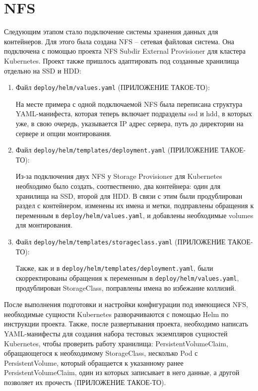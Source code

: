 \section{NFS}
\label{sec:nfs}

Следующим этапом стало подключение системы хранения данных для контейнеров. Для этого была создана NFS
-- сетевая файловая система. Она подключена с помощью проекта NFS Subdir External Provisioner для кластера Kubernetes. Проект также пришлось адаптировать под созданные хранилища отдельно на SSD
и HDD:
\begin{enumerate}
    \item Файл \texttt{deploy/helm/values.yaml} (ПРИЛОЖЕНИЕ ТАКОЕ-ТО):

        На месте примера с одной подключаемой NFS была переписана структура YAML-манифеста, которая теперь включает подразделы ssd и hdd, в которых уже, в свою очередь, указывается IP адрес сервера, путь до директории на сервере и опции монтирования.

    \item Файл \texttt{deploy/helm/templates/deployment.yaml} (ПРИЛОЖЕНИЕ ТАКОЕ-ТО):

        Из-за подключения двух NFS у Storage Provisioner
        для Kubernetes необходимо было создать, соотвественно, два контейнера: один для хранилища на SSD, второй для HDD. В связи с этим были продублирован раздел с контейнером, изменены их имена и метки, подправлены обращения к переменным в \texttt{deploy/helm/values.yaml}, и добавлены необходимые volumes
        для монтирования.

    \item Файл \texttt{deploy/helm/templates/storageclass.yaml} (ПРИЛОЖЕНИЕ ТАКОЕ-ТО):

        Также, как и в \texttt{deploy/helm/templates/deployment.yaml}, были скорректированы обращения к переменным в \texttt{deploy/helm/values.yaml}, продублирован StorageClass,
        поправлены имена во избежание коллизий.

\end{enumerate}

После выполнения подготовки и настройки конфигурации под имеющиеся NFS, необходимые сущности Kubernetes разворачиваются с помощью Helm по инструкции проекта. Также, после развертывания проекта, необходимо написать YAML-манифесты для создания набора тестовых экземпляров сущностей Kubernetes, чтобы проверить работу хранилища: PersistentVolumeClaim,
обращающегося к необходимому StorageClass, несколько Pod
с PersistentVolume,
который обращается к указанному ранее PersistentVolumeClaim, один из которых записывает в него данные, а другой позволяет их прочесть (ПРИЛОЖЕНИЕ ТАКОЕ-ТО).
